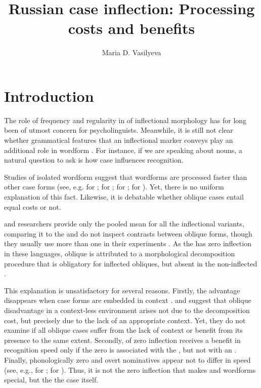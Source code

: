 \documentclass[output=paper, modfonts,newtxmath,hidelinks]{langscibook}
\title{Russian case inflection: Processing costs and benefits}
\author{Maria D. Vasilyeva \affiliation{Lomonosov Moscow State University}
}
\begin{document}
\maketitle
{}

\section{\label{sec:intro}Introduction}
The role of frequency and regularity in  of inflectional morphology has for long been of utmost concern for psycholinguists. Meanwhile, it is still not clear whether grammatical features that an inflectional marker conveys play an additional role in wordform . For instance, if we are speaking about nouns, a natural question to ask is how case influences  recognition.

Studies of isolated wordform  suggest that  wordforms are processed faster than other case forms (see, e.g. \citealt{lukatela1978lexical}  for ; \citealt{niemi1994cognitive} for ; \citealt{abulizi2016cognitive} for ; \citealt{gor2017processing} for ). Yet, there is no uniform explanation of this fact. Likewise, it is debatable whether oblique cases entail equal  costs or not.

 and  researchers provide only  the pooled mean for all the inflectional variants, comparing it to the  and do not inspect contrasts between oblique forms, though they usually use more than one  in their experiments \citep{niemi1991recognition, niemi1994cognitive, hyovcnavc1995effects, laine1998lexical, laine1999lexical, abulizi2016cognitive}. As the  has zero inflection in these languages, oblique  is attributed to a morphological decomposition procedure that is obligatory for inflected obliques, but absent in the non-inflected .

This explanation is unsatisfactory for several reasons. Firstly, the  advantage disappears when  case forms are embedded in context  \citep{bertram2000role, hyona2002morphological}. \citet{bertram2000role} and \citet{hyona2002morphological} suggest that oblique  disadvantage in a context-less environment arises not due to the decomposition cost, but precisely due to the lack of an appropriate context. Yet, they do not examine if all oblique cases suffer from the lack of context or benefit from its presence to the same extent. Secondly,  of zero inflection receives a benefit in recognition speed only if the zero is associated with the , but not with an  \citep{gor2017processing}.  Finally, phonologically zero and overt nominatives appear not to differ in  speed (see, e.g., \citealt{lukatelaEtAl1980} for ; \citealt{gor2017processing} for ). Thus, it is not the zero inflection that makes  and   wordforms special, but the the  case itself.
\end{document}
